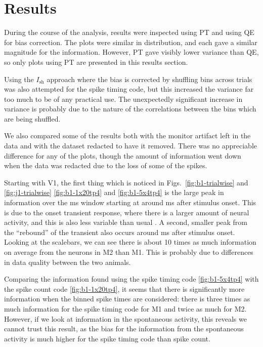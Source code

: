 \section{Results}

During the course of the analysis, results were inspected using \ac{PT} and using \ac{QE} for bias correction.
The plots were similar in distribution, and each gave a similar magnitude for the information.
However, \ac{PT} gave visibly lower variance than \ac{QE}, so only plots using \ac{PT} are presented in this results section.

Using the $I_{\text{sh}}$ approach where the bias is corrected by shuffling bins across trials \cite{Montemurro2007} was also attempted for the spike timing code, but this increased the variance far too much to be of any practical use.
The unexpectedly significant increase in variance is probably due to the nature of the correlations between the bins which are being shuffled.

We also compared some of the results both with the monitor artifact left in the data and with the dataset redacted to have it removed.
There was no appreciable difference for any of the plots, though the amount of information went down when the data was redacted due to the loss of some of the spikes.



Starting with \ac{V1}, the first thing which is noticed in Figs.~\ref{fig:b1-trialwise} and \ref{fig:j1-trialwise} \ref{fig:b1-1x20tp4} and \ref{fig:b1-5x4tp4} is the large peak in information over the \unit[20]{ms} window starting at around \unit[40]{ms} after stimulus onset.
This is due to the onset transient response, where there is a larger amount of neural activity, and this is also less variable than usual \cite{Muller2001}.
A second, smaller peak from the ``rebound'' of the transient also occurs around \unit[100]{ms} after stimulus onset.
Looking at the scalebars, we can see there is about 10 times as much information on average from the neurons in \ac{M2} than \ac{M1}.
This is probably due to differences in data quality between the two animals.

Comparing the information found using the spike timing code \ref{fig:b1-5x4tp4} with the spike count code \ref{fig:b1-1x20tp4}, it seems that there is significantly more information when the binned spike times are considered: there is three times as much information for the spike timing code for \ac{M1} and twice as much for \ac{M2}.
However, if we look at information in the spontaneous activity, this reveals we cannot trust this result, as the bias for the information from the spontaneous activity is much higher for the spike timing code than spike count.

